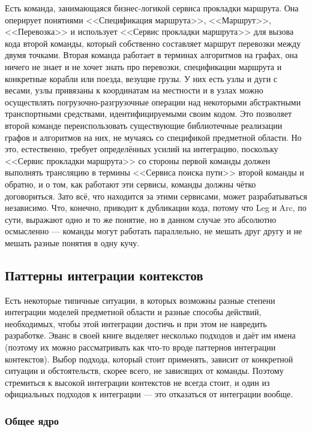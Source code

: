 \documentclass{../../text-style}
\begin{document}
Есть команда, занимающаяся бизнес-логикой сервиса прокладки маршрута. Она оперирует понятиями <<Спецификация маршрута>>, <<Маршрут>>, <<Перевозка>> и использует <<Сервис прокладки маршрута>> для вызова кода второй команды, который собственно составляет маршрут перевозки между двумя точками. Вторая команда работает в терминах алгоритмов на графах, она ничего не знает и не хочет знать про перевозки, спецификации маршрута и конкретные корабли или поезда, везущие грузы. У них есть узлы и дуги с весами, узлы привязаны к координатам на местности и в узлах можно осуществлять погрузочно-разгрузочные операции над некоторыми абстрактными транспортными средствами, идентифицируемыми своим кодом. Это позволяет второй команде переиспользовать существующие библиотечные реализации графов и алгоритмов на них, не мучаясь со спецификой предметной области. Но это, естественно, требует определённых усилий на интеграцию, поскольку <<Сервис прокладки маршрута>> со стороны первой команды должен выполнять трансляцию в термины <<Сервиса поиска пути>> второй команды и обратно, и о том, как работают эти сервисы, команды должны чётко договориться. Зато всё, что находится за этими сервисами, может разрабатываться независимо. Что, конечно, приводит к дубликации кода, потому что Leg и Arc, по сути, выражают одно и то же понятие, но в данном случае это абсолютно осмысленно --- команды могут работать параллельно, не мешать друг другу и не мешать разные понятия в одну кучу.

\subsection{Паттерны интеграции контекстов}

Есть некоторые типичные ситуации, в которых возможны разные степени интеграции моделей предметной области и разные способы действий, необходимых, чтобы этой интеграции достичь и при этом не навредить разработке. Эванс в своей книге выделяет несколько подходов и даёт им имена (поэтому их можно рассматривать как что-то вроде паттернов интеграции контекстов). Выбор подхода, который стоит применять, зависит от конкретной ситуации и обстоятельств, скорее всего, не зависящих от команды. Поэтому стремиться к высокой интеграции контекстов не всегда стоит, и один из официальных подходов к интеграции --- это отказаться от интеграции вообще.

\subsubsection{Общее ядро}
\end{document}
